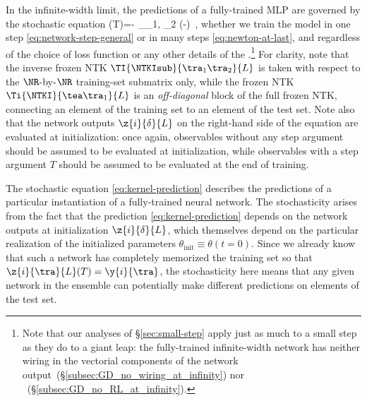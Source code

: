 In the infinite-width limit, the predictions of a fully-trained MLP are governed by the stochastic equation
\be\label{eq:kernel-prediction}
(T)=- \sum_{\tra_1, \tra_2 \in\A}   \le(-\ri)\, ,
\ee
whether we train the model in one step \eqref{eq:network-step-general} or in many steps \eqref{eq:newton-at-last}, and regardless of the choice of loss function or any other details of the .\footnote{
    Note that our analyses of \S\ref{sec:small-step} apply just as much to a small step as they do to a giant leap: the fully-trained infinite-width network has neither wiring in the vectorial components of the network output~(\S\ref{subsec:GD_no_wiring_at_infinity}) nor ~(\S\ref{subsec:GD_no_RL_at_infinity}).
}
For clarity, note that the inverse frozen NTK $\TI{\NTKIsub}{\tra_1 \tra_2}{L}$ is taken with respect to the $\NR$-by-$\NR$ training-set submatrix only, while the frozen NTK $\Ti{\NTKI}{\tea \tra_1}{L}$ is an \emph{off-diagonal} block of the full frozen NTK, connecting an element of the training set to an element of the test set. Note also that the network outputs $\z{i}{\delta}{L}$ on the right-hand side of the equation are evaluated at initialization: once again, 
observables without any step argument should be assumed to be evaluated at initialization, while observables with a step argument $T$ should be assumed to be evaluated at the end of training.







The stochastic equation \eqref{eq:kernel-prediction} describes the predictions of a particular instantiation of a fully-trained neural network. The stochasticity arises from the fact that the prediction \eqref{eq:kernel-prediction} depends on the network outputs at initialization $\z{i}{\delta}{L}$, which themselves depend on the particular realization of the initialized parameters $\theta_{\text{init}} \equiv \theta(t=0)$.
Since we already know that such a network has completely memorized the training set so that $\z{i}{\tra}{L}(T) = \y{i}{\tra}$, the stochasticity here means that any given network in the ensemble can potentially make different predictions on elements of the test set.

